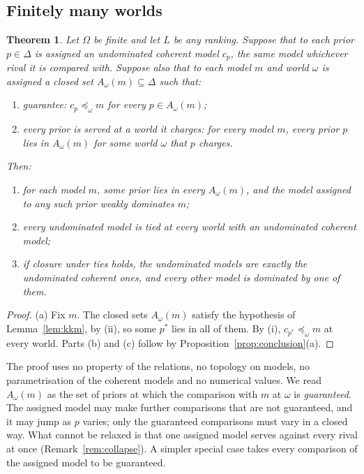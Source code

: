 \documentclass[11pt]{article}
\newtheorem{theorem}{Theorem}[section]
\theoremstyle{definition}
\theoremstyle{remark}
\begin{document}
\subsection{Finitely many worlds}
\begin{theorem}\label{thm:finite}
Let $\Omega$ be finite and let $L$ be any ranking. Suppose that to each prior $p\in\Delta$ is assigned an undominated coherent model $c_p$, the same model whichever rival it is compared with. Suppose also that to each model $m$ and world $\omega$ is assigned a closed set $A_\omega(m)\subseteq\Delta$ such that:
\begin{enumerate}[label=(\roman*)]
\item \emph{guarantee}: $c_p\preceq_\omega m$ for every $p\in A_\omega(m)$;
\item \emph{every prior is served at a world it charges}: for every model $m$, every prior $p$ lies in $A_\omega(m)$ for some world $\omega$ that $p$ charges.
\end{enumerate}
Then:
\begin{enumerate}[label=(\alph*)]
\item for each model $m$, some prior lies in every $A_\omega(m)$, and the model assigned to any such prior weakly dominates $m$;
\item every undominated model is tied at every world with an undominated coherent model;
\item if closure under ties holds, the undominated models are exactly the undominated coherent ones, and every other model is dominated by one of them.
\end{enumerate}
\end{theorem}
\begin{proof}
(a) Fix $m$. The closed sets $A_\omega(m)$ satisfy the hypothesis of Lemma~\ref{lem:kkm}, by (ii), so some $p^*$ lies in all of them. By (i), $c_{p^*}\preceq_\omega m$ at every world. Parts (b) and (c) follow by Proposition~\ref{prop:conclusion}(a).
\end{proof}

The proof uses no property of the relations, no topology on models, no parametrisation of the coherent models and no numerical values. We read $A_\omega(m)$ as the set of priors at which the comparison with $m$ at $\omega$ is \emph{guaranteed}. The assigned model may make further comparisons that are not guaranteed, and it may jump as $p$ varies; only the guaranteed comparisons must vary in a closed way. What cannot be relaxed is that one assigned model serves against every rival at once (Remark~\ref{rem:collapse}). A simpler special case takes every comparison of the assigned model to be guaranteed.
\end{document}
